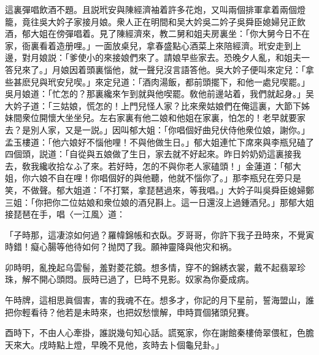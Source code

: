 這裏彈唱飲酒不題。且説玳安與陳經濟袖着許多花炮，又叫兩個排軍拿着兩個燈籠，竟往吳大妗子家接月娘。衆人正在明間和吴大妗吳二妗子吳舜臣媳婦兒正飲酒，郁大姐在傍彈唱着。見了陳經濟來，教二舅和姐夫房裏坐：「你大舅今日不在家，衙裏看着造册哩。」一面放桌兒，拿春盛點心酒菜上來陪經濟。玳安走到上邊，對月娘説：「爹使小的來接娘們來了。請娘早些家去。恐晚夕人亂，和姐夫一答兒來了。」月娘因着頭裏惱他，就一聲兒沒言語答他。吳大妗子便叫來定兒：「拿些甚麽兒與玳安兒喫。」來定兒道：「酒肉湯飯，都前頭擺下，和他一處兒喫罷。」吳月娘道：「忙怎的？那裏纔來乍到就與他喫罷。敎他前邊站着，我們就起身。」吴大妗子道：「三姑娘，慌怎的！上門兒怪人家？比來衆姑娘們在俺這裏，大節下姊妹間衆位開懷大坐坐兒。左右家裏有他二娘和他姐在家裏，怕怎的！老早就要家去？是別人家，又是一説。」因叫郁大姐：「你唱個好曲兒伏侍他衆位娘，謝你。」孟玉樓道：「他六娘好不惱他哩！不與他做生日。」郁大姐連忙下席來與李瓶兒磕了四個頭，説道：「自從與五娘做了生日，家去就不好起來。昨日妗奶奶這裏接我去，敎我纔收拾なふ了來。若好時，怎的不與你老人家磕頭！」金蓮道：「郁大姐，你六娘不自在哩！你唱個好的與他聽，他就不惱你了。」那李瓶兒在旁只是笑，不做聲。郁大姐道：「不打緊，拿琵琶過來，等我唱。」大妗子叫吳舜臣媳婦鄭三姐：「你把你二位姑娘和衆位娘的酒兒斟上。這一日還沒上過鍾酒兒。」那郁大姐接琵琶在手，唱〈一江風〉道：

「子時那，這凄涼如何過？羅幃錦帳和衣臥。歹哥哥，你許下我子丑時來，不覺寅時錯！癡心腸等他待如何？抛閃了我。願神靈降與他灾和祸。

卯時明，亂挽起乌雲髻，羞對菱花鏡。想多情，穿不的錦綉衣裳，戴不起翡翠珍珠，解不開心頭悶。辰時已過了，巳時不見影。奴家為你憂成病。

午時牌，這相思眞個害，害的我魂不在。想多才，你記的月下星前，誓海盟山，誰把你輕看待？他若是未時來，也把奴愁懷解，申時買個猪頭兒賽。

酉時下，不由人心牽掛，誰説幾句知心話。謊冤家，你在謝館秦樓倚翠偎紅，色膽天來大。戌時點上燈，早晚不見他，亥時去卜個龜兒卦。」


